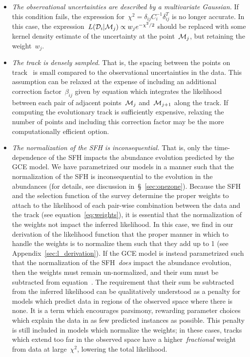 \documentclass[ms.tex]{subfiles}
\begin{document}
\begin{itemize}
\begin{itemize}
		\item \textit{The observational uncertainties are described by a
		multivariate Gaussian.}
		If this condition fails, the expression for~$\chi^2 =
		\delta_{ij}C_i^{-1}\delta_{ij}^T$ is no longer accurate.
		In this case, the expression~$L(\mathcal{D}_i | \mathcal{M}_j) \propto
		w_j e^{-\chi^2/2}$ should be replaced with some kernel density
		estimate of the uncertainty at the point~$\mathcal{M}_j$, but retaining
		the weight~$w_j$.

		\item \textit{The track is densely sampled.}
		That is, the spacing between the points on track~ is small
		compared to the observational uncertainties in the data.
		This assumption can be relaxed at the expense of including an
		additional correction factor~$\beta_{ij}$ given by equation
		 which integrates the likelihood between each
		pair of adjacent points~$\mathcal{M}_j$ and~$\mathcal{M}_{j + 1}$ along
		the track.
		If computing the evolutionary track is sufficiently expensive,
		relaxing the number of points and including this correction factor may
		be the more computationally efficient option.

		\item \textit{The normalization of the SFH is inconsequential.}
		That is, only the time-dependence of the SFH impacts the abundance
		evolution predicted by the GCE model.
		We have parametrized our models in a manner such that the normalization
		of the SFH is inconsequential to the evolution in the abundances (for
		details, see discussion in~\S~\ref{sec:onezone}).
		Because the SFH and the selection function of the survey determine the
		proper weights to attach to the likelihood of each pair-wise
		combination between the data and the track (see
		equation~\ref{eq:weights}), it is essential that the normalization of
		the weights not impact the inferred likelihood.
		In this case, we find in our derivation of the likelihood function that
		the proper manner in which to handle the weights is to normalize them
		such that they add up to 1 (see Appendix~\ref{sec:l_derivation}).
		If the GCE model is instead parametrized such that the normalization of
		the SFH~\textit{does} impact the abundance evolution, then the weights
		must remain un-normalized, and their sum must be subtracted from
		equation~.
		The requirement that their sum be subtracted from the inferred
		likelihood can be qualitatively understood as a penalty for models
		which predict data in regions of the observed space where there is
		none.
		It is a term which encourages parsimony, rewarding parameter choices
		which explain the data in as few predicted instances as possible.
		This penalty is still included in models which normalize the weights;
		in these cases, tracks which extend too far in the observed space
		have a higher~\textit{fractional} weight from data at large~$\chi^2$,
		lowering the total likelihood.
	\end{itemize}


\end{itemize}
\end{document}
